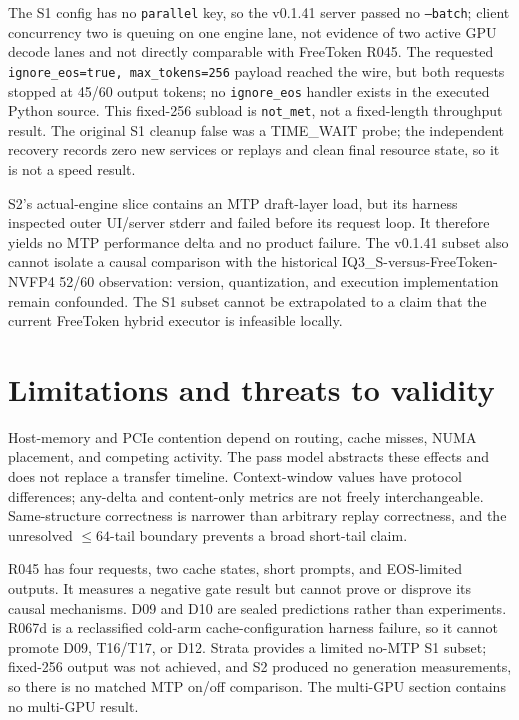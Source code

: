 \documentclass[11pt]{article}
\begin{document}
The S1 config has no \texttt{parallel} key, so the v0.1.41 server passed no \texttt{--batch}; client concurrency two is queuing on one engine lane, not evidence of two active GPU decode lanes and not directly comparable with FreeToken R045. The requested \texttt{ignore\_eos=true, max\_tokens=256} payload reached the wire, but both requests stopped at 45/60 output tokens; no \texttt{ignore\_eos} handler exists in the executed Python source. This fixed-256 subload is \texttt{not\_met}, not a fixed-length throughput result. The original S1 cleanup false was a TIME\_WAIT probe; the independent recovery records zero new services or replays and clean final resource state, so it is not a speed result.

S2's actual-engine slice contains an MTP draft-layer load, but its harness inspected outer UI/server stderr and failed before its request loop. It therefore yields no MTP performance delta and no product failure. The v0.1.41 subset also cannot isolate a causal comparison with the historical IQ3\_S-versus-FreeToken-NVFP4 52/60 observation: version, quantization, and execution implementation remain confounded. The S1 subset cannot be extrapolated to a claim that the current FreeToken hybrid executor is infeasible locally.

\section{Limitations and threats to validity}

Host-memory and PCIe contention depend on routing, cache misses, NUMA placement, and competing activity. The pass model abstracts these effects and does not replace a transfer timeline. Context-window values have protocol differences; any-delta and content-only metrics are not freely interchangeable. Same-structure correctness is narrower than arbitrary replay correctness, and the unresolved $\leq64$-tail boundary prevents a broad short-tail claim.

R045 has four requests, two cache states, short prompts, and EOS-limited outputs. It measures a negative gate result but cannot prove or disprove its causal mechanisms. D09 and D10 are sealed predictions rather than experiments. R067d is a reclassified cold-arm cache-configuration harness failure, so it cannot promote D09, T16/T17, or D12. Strata provides a limited no-MTP S1 subset; fixed-256 output was not achieved, and S2 produced no generation measurements, so there is no matched MTP on/off comparison. The multi-GPU section contains no multi-GPU result.
\end{document}
